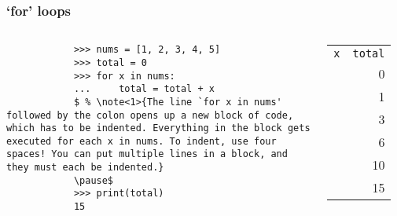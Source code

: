 \documentclass[notes]{beamer}
\begin{document}
	\begin{frame}[fragile]
		\frametitle{`for' loops}
		
		\begin{columns}[c]
			\begin{lstlisting}
			>>> nums = [1, 2, 3, 4, 5]
			>>> total = 0
			>>> for x in nums:
			...     total = total + x
			$ % \note<1>{The line `for x in nums' followed by the colon opens up a new block of code, which has to be indented. Everything in the block gets executed for each x in nums. To indent, use four spaces! You can put multiple lines in a block, and they must each be indented.}
			\pause$
			>>> print(total)
			15
			\end{lstlisting}
			
			\pause
			\begin{tabular}{l | r}
				\lstinline|x| & \lstinline|total| \\
				\, & 0 \\ \pause
				1 & 1 \\ \pause
				2 & 3 \\ \pause
				3 & 6 \\ \pause
				4 & 10 \\ \pause
				5 & 15 \\
			\end{tabular}
		\end{columns}
		
		
	\end{frame}
	
\end{document}
